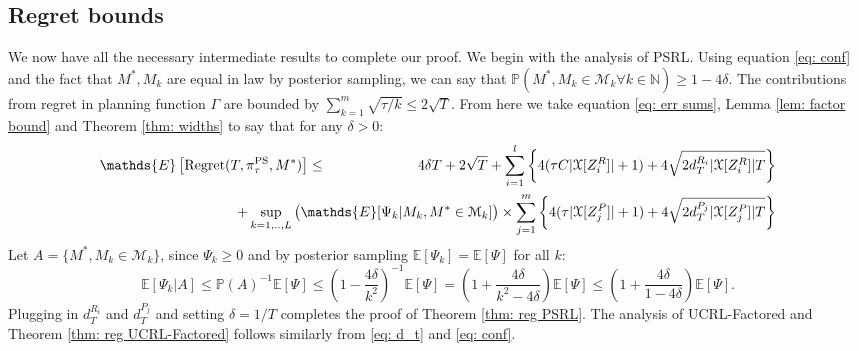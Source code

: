 \documentclass{article}
\newcommand{\Exp}{\mathds{E}}
\newcommand{\Prob}{\mathds{P}}
\newcommand{\Nat}{\mathbb{N}}
\newcommand{\Xc}{\mathcal{X}}
\newcommand{\Mc}{\mathcal{M}}
\begin{document}
\subsection{Regret bounds}
\label{sec: bounds}
We now have all the necessary intermediate results to complete our proof.
We begin with the analysis of PSRL.
Using equation \eqref{eq: conf} and the fact that $M^*,M_k$ are equal in law by posterior sampling, we can say that $\Prob( M^*, M_k \in \Mc_k \forall k \in \Nat) \ge 1-4\delta$.
The contributions from regret in planning function $\Gamma$ are bounded by $ \sum_{k=1}^m \sqrt{\tau/k} \le 2\sqrt{T}$.
From here we take equation \eqref{eq: err sums}, Lemma \ref{lem: factor bound} and Theorem \ref{thm: widths} to say that for any $\delta > 0 $:
\begin{eqnarray*}
	\Exp \left[\mathrm{Regret}(T, \pi^{\rm PS}_{\tau}, M^*) \right] &\le& 4\delta T +2 \sqrt{T} +
		\sum_{i=1}^l \left\{ 4(\tau C |\Xc[Z^R_i]| + 1) + 4\sqrt{2d_T^{R_i} | \Xc[Z^R_i]| T} \right\} \\
	&& \hspace{-25mm} + \sup_{k=1,..,L} \big( \Exp[\Psi_k | M_k, M^* \in \Mc_k] \big) \times \sum_{j=1}^m \left\{ 4(\tau |\Xc[Z^P_j]| + 1) + 4\sqrt{2d_T^{P_j} | \Xc[Z^P_j]| T} \right\}
\end{eqnarray*}
Let $A = \{ M^*, M_k \in \Mc_k \}$, since $\Psi_k \ge 0$ and by posterior sampling $\Exp [ \Psi_k ] = \Exp [\Psi]$ for all $k$:
$$\Exp[ \Psi_k \vert A  ] \le \Prob(A)^{-1} \Exp[\Psi] \le \left( 1 - \frac{4 \delta}{k^2} \right)^{-1} \Exp[ \Psi ] = \left(1 + \frac{4\delta}{k^2 - 4\delta} \right) \Exp[ \Psi ] \le \left(1 + \frac{4\delta}{1 - 4\delta} \right) \Exp[ \Psi ].$$
Plugging in $d_T^{R_i}$ and $d_T^{P_j}$ and setting $\delta=1/T$ completes the proof of Theorem \ref{thm: reg PSRL}.
The analysis of UCRL-Factored and Theorem \ref{thm: reg UCRL-Factored} follows similarly from \eqref{eq: d_t} and \eqref{eq: conf}.
\end{document}
